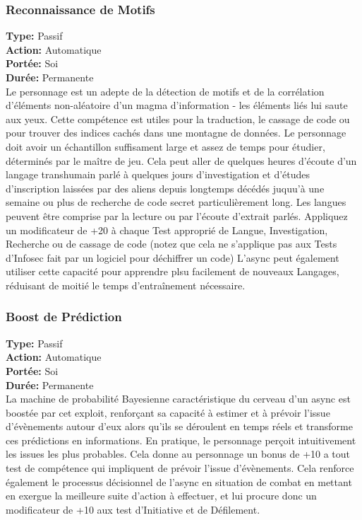 \subsubsection{Reconnaissance de Motifs} \textbf{Type:} Passif \\ \textbf{Action:} Automatique \\ \textbf{Portée:} Soi \\ \textbf{Durée:} Permanente \\ Le personnage est un adepte de la détection de motifs et de la corrélation d'éléments non-aléatoire d'un magma d'information - les éléments liés lui saute aux yeux. Cette compétence est utiles pour la traduction, le cassage de code ou pour trouver des indices cachés dans une montagne de données. Le personnage doit avoir un échantillon suffisament large et assez de temps pour étudier, déterminés par le maître de jeu. Cela peut aller de quelques heures d'écoute d'un langage transhumain parlé à quelques jours d'investigation et d'études d'inscription laissées par des aliens depuis longtemps décédés juquu'à une semaine ou plus de recherche de code secret particulièrement long. Les langues peuvent être comprise par la lecture ou par l'écoute d'extrait parlés. Appliquez un modificateur de +20 à chaque Test approprié de Langue, Investigation, Recherche ou de cassage de code (notez que cela ne s'applique pas aux Tests d'Infosec fait par un logiciel pour déchiffrer un code) L'async peut également utiliser cette capacité pour apprendre plsu facilement de nouveaux Langages, réduisant de moitié le temps d'entraînement nécessaire. 

\subsubsection{Boost de Prédiction} \textbf{Type:} Passif \\ \textbf{Action:} Automatique \\ \textbf{Portée:} Soi \\ \textbf{Durée:} Permanente \\ La machine de probabilité Bayesienne caractéristique du cerveau d'un async est boostée par cet exploit, renforçant sa capacité à estimer et à prévoir l'issue d'évènements autour d'eux alors qu'ils se déroulent en temps réels et transforme ces prédictions en informations. En pratique, le personnage perçoit intuitivement les issues les plus probables. Cela donne au personnage un bonus de +10 a tout test de compétence qui impliquent de prévoir l'issue d'évènements. Cela renforce également le processus décisionnel de l'async en situation de combat en mettant en exergue la meilleure suite d'action à effectuer, et lui procure donc un modificateur de +10 aux test d'Initiative et de Défilement. 

